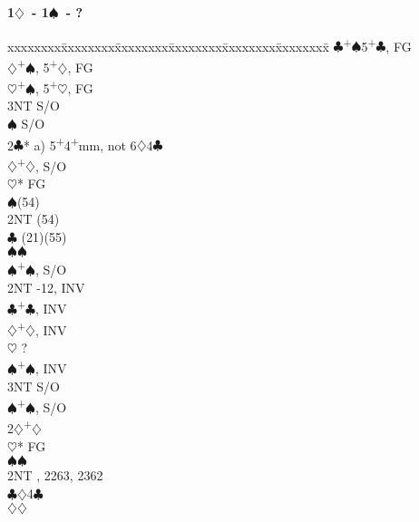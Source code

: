 \documentclass[10pt]{article}
\renewcommand{\c}{$\clubsuit$}
\renewcommand{\d}{$\diamondsuit$}
\newcommand{\h}{$\heartsuit$}
\newcommand{\s}{$\spadesuit$}
\newcommand{\p}{\textsuperscript{+}}
\newenvironment{bidtable}[1][]
{\textbf{#1}
  \begin{adjustwidth}{1em}{}
    \addvspace{2pt}
    \begin{tabbing}
      xxxxxxxx\=xxxxxxxx\=xxxxxxxx\=xxxxxxxx\=xxxxxxxx\=xxxxxxxx\=\kill}
{\end{tabbing}\end{adjustwidth}\bigskip}%
\begin{document}
\begin{multicols*}{2}
\begin{bidtable}[1\d\ - 1\s\ - ?]
     \c  {}\p\s 5\p\c, FG                        \\
     \d  {}\p\s, 5\p\d, FG                       \\
     \h  {}\p\s, 5\p\h, FG                       \\
     \> 3NT  \> S/O                                    \\
     \s  \> S/O                                    \\
2\c* \> a) 5\p 4\p mm, not 6\d 4\c                     \\
     \d  {}\p\d, S/O                             \\
     \h* \> FG                                     \\
     \>      \s {}(54)                          \\
     \>      \> 2NT (54)                          \\
     \>      \c \> (21)(55)                        \\
     \>      \s {}\s                             \\
     \s  {}\p\s, S/O                             \\
     \> 2NT  -12, INV                              \\
     \c  {}\p\c, INV                             \\
     \d  {}\p\d, INV                             \\
     \h  \> ?                                      \\
     \s  {}\p\s, INV                             \\
     \> 3NT  \> S/O                                    \\
     \s  {}\p\s, S/O                             \\
2\d  {}\p\d                                   \\
     \h* \> FG                                     \\
     \>      \s {}\s                             \\
     \>      \> 2NT , 2263, 2362                \\
     \>      \c {}\d 4\c                         \\
     \>      \d {}\d                             \\

\end{bidtable}
\end{multicols*}
\end{document}

